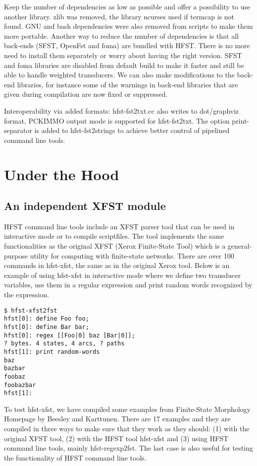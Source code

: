 \documentclass{llncs}
\begin{document}
Keep the number of dependencies as low as possible and offer a
possibility to use another library. zlib was removed, the library
ncurses used if termcap is not found. GNU and bash dependencies were
also removed from scripts to make them more portable. Another way to
reduce the number of dependencies is that all back-ends (SFST, OpenFst
and foma) are bundled with HFST. There is no more need to install them
separately or worry about having the right version. SFST and foma
libraries are disabled from default build to make it faster and still
be able to handle weighted transducers. We can also make modifications
to the back-end libraries, for instance some of the warnings in
back-end libraries that are given during compilation are now fixed or
suppressed.

Interoperability via added formats: hfst-fst2txt.cc also writes to
dot/graphviz format, PCKIMMO output mode is supported for
hfst-fst2txt. The option print-separator is added to hfst-fst2strings
to achieve better control of pipelined command line tools.

\section{Under the Hood}

\subsection{An independent XFST module}

HFST command line tools include an XFST parser tool that can be used
in interactive mode or to compile scriptfiles. The tool implements the
same functionalities as the original XFST (Xerox Finite-State Tool)
which is a general-purpose utility for computing with finite-state
networks. There are over 100 commands in hfst-xfst, the same as in the
original Xerox tool. Below is an example of using hfst-xfst in
interactive mode where we define two transducer variables, use them in
a regular expression and print random words recognized by the
expression.

\begin{verbatim}
$ hfst-xfst2fst 
hfst[0]: define Foo foo;
hfst[0]: define Bar bar;
hfst[0]: regex [[Foo|0] baz [Bar|0]];
? bytes. 4 states, 4 arcs, ? paths
hfst[1]: print random-words
baz
bazbar
foobaz
foobazbar
hfst[1]: 
\end{verbatim}

To test hfst-xfst, we have compiled some examples from Finite-State
Morphology Homepage by Beesley and Karttunen.  There are 17 examples
and they are compiled in three ways to make sure that they work as
they should: (1) with the original XFST tool, (2) with the HFST tool
hfst-xfst and (3) using HFST command line tools, mainly
hfst-regexp2fst. The last case is also useful for testing the
functionality of HFST command line tools.
\end{document}
